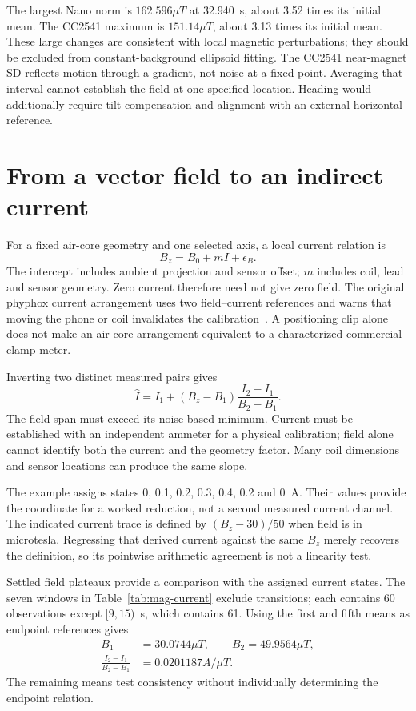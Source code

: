 The largest Nano norm is $162.596\unit{\mu T}$ at 32.940~s, about 3.52 times its initial mean. The CC2541 maximum is $151.14\unit{\mu T}$, about 3.13 times its initial mean. These large changes are consistent with local magnetic perturbations; they should be excluded from constant-background ellipsoid fitting. The CC2541 near-magnet SD reflects motion through a gradient, not noise at a fixed point. Averaging that interval cannot establish the field at one specified location. Heading would additionally require tilt compensation and alignment with an external horizontal reference.

\section{From a vector field to an indirect current}
For a fixed air-core geometry and one selected axis, a local current relation is
\begin{equation}
 B_z=B_0+mI+\epsilon_B.
 \label{eq:mag-current-model}
\end{equation}
The intercept includes ambient projection and sensor offset; $m$ includes coil, lead and sensor geometry. Zero current therefore need not give zero field. The original phyphox current arrangement uses two field--current references and warns that moving the phone or coil invalidates the calibration~\cite{phyphoxammeters2018}. A positioning clip alone does not make an air-core arrangement equivalent to a characterized commercial clamp meter.

Inverting two distinct measured pairs gives
\begin{equation}
 \widehat I=I_1+(B_z-B_1)\frac{I_2-I_1}{B_2-B_1}.
 \label{eq:mag-current-inverse}
\end{equation}
The field span must exceed its noise-based minimum. Current must be established with an independent ammeter for a physical calibration; field alone cannot identify both the current and the geometry factor. Many coil dimensions and sensor locations can produce the same slope.

The example assigns states 0, 0.1, 0.2, 0.3, 0.4, 0.2 and 0~A. Their values provide the coordinate for a worked reduction, not a second measured current channel. The indicated current trace is defined by $(B_z-30)/50$ when field is in microtesla. Regressing that derived current against the same $B_z$ merely recovers the definition, so its pointwise arithmetic agreement is not a linearity test.

Settled field plateaux provide a comparison with the assigned current states. The seven windows in Table~\ref{tab:mag-current} exclude transitions; each contains 60 observations except $[9,15)$~s, which contains 61. Using the first and fifth means as endpoint references gives
\begin{equation}
 \begin{aligned}
 B_1&=30.0744\unit{\mu T},\qquad B_2=49.9564\unit{\mu T},\\
 \frac{I_2-I_1}{B_2-B_1}&=0.0201187\unit{A/\mu T}.
 \end{aligned}
 \label{eq:mag-current-endpoints}
\end{equation}
The remaining means test consistency without individually determining the endpoint relation.

